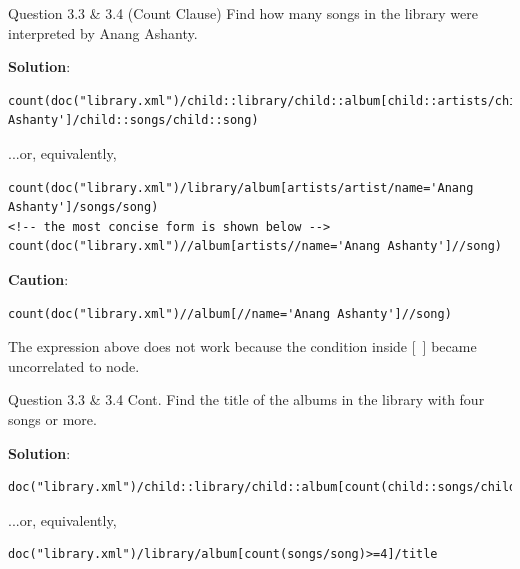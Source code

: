 \begin{frame}[fragile]{Question 3.3 \& 3.4 (Count Clause)}
Find how many songs in the library were interpreted by Anang Ashanty.\\\vspace{5pt}
	
\textbf{Solution}: \\
\begin{lstlisting}[style=xml-small-nomargin]
count(doc("library.xml")/child::library/child::album[child::artists/child::artist/child::name='Anang Ashanty']/child::songs/child::song)
\end{lstlisting}\vspace{5pt}
...or, equivalently,
\begin{lstlisting}[style=xml-small-nomargin]
count(doc("library.xml")/library/album[artists/artist/name='Anang Ashanty']/songs/song)
<!-- the most concise form is shown below -->
count(doc("library.xml")//album[artists//name='Anang Ashanty']//song)
\end{lstlisting}\vspace{5pt}

\textbf{Caution}:
\begin{lstlisting}[style=xml-small-nomargin]
count(doc("library.xml")//album[//name='Anang Ashanty']//song)
\end{lstlisting}
The expression above does not work because the condition inside [\ ] became uncorrelated to node.

\end{frame}

\begin{frame}[fragile]{Question 3.3 \& 3.4 Cont.}
Find the title of the albums in the library with four songs or more.\\\vspace{5pt}
	
\textbf{Solution}: \\
\begin{lstlisting}[style=xml-small-nomargin]
doc("library.xml")/child::library/child::album[count(child::songs/child::song)>=4]/child::title
\end{lstlisting}\vspace{5pt}
...or, equivalently,
\begin{lstlisting}[style=xml-small-nomargin]
doc("library.xml")/library/album[count(songs/song)>=4]/title
\end{lstlisting}\vspace{5pt}

\end{frame}


